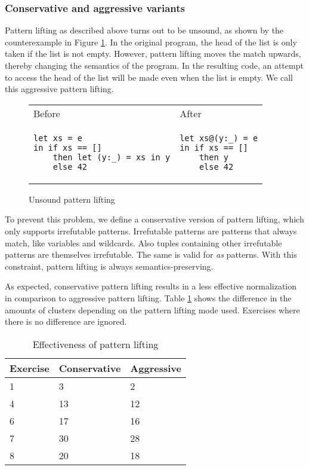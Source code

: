 \subsubsection{Conservative and aggressive variants}

Pattern lifting as described above turns out to be unsound, as shown by the counterexample in Figure \ref{fig:pattern-lifting-unsound}. In the original program, the head of the list is only taken if the list is not empty. However, pattern lifting moves the match upwards, thereby changing the semantics of the program. In the resulting code, an attempt to access the head of the list will be made even when the list is empty. We call this aggressive pattern lifting.

\begin{figure}
\centering
\begin{tabular}{ >{\centering\arraybackslash}m{17em} >{\centering\arraybackslash}m{10em} }
Before & After \\
\begin{verbatim}
let xs = e
in if xs == []
    then let (y:_) = xs in y
    else 42
\end{verbatim}
& \begin{verbatim}
let xs@(y:_) = e
in if xs == []
    then y
    else 42
\end{verbatim}
\end{tabular}
\caption{Unsound pattern lifting}
\label{fig:pattern-lifting-unsound}
\end{figure}

To prevent this problem, we define a conservative version of pattern lifting, which only supports irrefutable patterns. Irrefutable patterns are patterns that always match, like variables and wildcards. Also tuples containing other irrefutable patterns are themselves irrefutable. The same is valid for \emph{as} patterns. With this constraint, pattern lifting is always semantics-preserving.

As expected, conservative pattern lifting results in a less effective normalization in comparison to aggressive pattern lifting. Table \ref{tb:patterns-lifting-effectiveness} shows the difference in the amounts of clusters depending on the pattern lifting mode used. Exercises where there is no difference are ignored.

\begin{table}
\centering
\begin{tabular}{ m{6em} | m{6em} | m{6em} }
Exercise & Conservative & Aggressive \\
\hline
1 & 3 & 2 \\
\hline
4 & 13 & 12 \\
\hline
6 & 17 & 16 \\
\hline
7 & 30 & 28 \\
\hline
8 & 20 & 18
\end{tabular}
\caption{Effectiveness of pattern lifting}
\label{tb:patterns-lifting-effectiveness}
\end{table}

